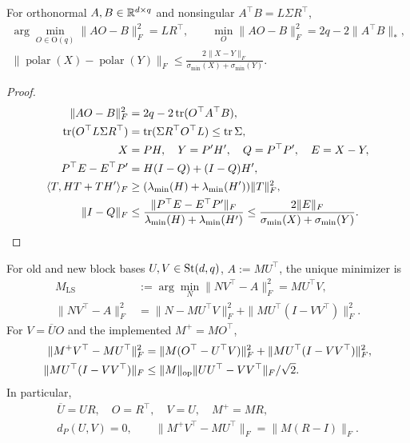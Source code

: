 \begin{lemma}\label{lem:rigid-polar}
For orthonormal $A,B\in\mathbb R^{d\times q}$ and nonsingular $A^\top B=L\Sigma R^\top$,
\begin{gather}
 \arg\min_{O\in\mathrm O(q)}\|AO-B\|_F^2=LR^\top,\qquad
 \min_O\|AO-B\|_F^2=2q-2\|A^\top B\|_*,\\
 \|\operatorname{polar}(X)-\operatorname{polar}(Y)\|_F
 \le\frac{2\|X-Y\|_F}{\sigma_{\min}(X)+\sigma_{\min}(Y)}.
\end{gather}
\end{lemma}
\begin{proof}
\begin{align}
 \|AO-B\|_F^2&=2q-2\operatorname{tr}(O^\top A^\top B),\\
 \operatorname{tr}(O^\top L\Sigma R^\top)&=\operatorname{tr}(\Sigma R^\top O^\top L)
 \le\operatorname{tr}\Sigma,\\
 X&=PH,\quad Y=P'H',\quad Q=P^\top P',\quad E=X-Y,\\
 P^\top E-E^\top P'&=H(I-Q)+(I-Q)H',\\
 \langle T,HT+TH'\rangle_F
 &\ge(\lambda_{\min}(H)+\lambda_{\min}(H'))\|T\|_F^2,\\
 \|I-Q\|_F&\le\frac{\|P^\top E-E^\top P'\|_F}
                         {\lambda_{\min}(H)+\lambda_{\min}(H')}
 \le\frac{2\|E\|_F}{\sigma_{\min}(X)+\sigma_{\min}(Y)}.
\end{align}
\end{proof}
\begin{proposition}
\label{prop:rigid-transport}
For old and new block bases $U,V\in\operatorname{St}(d,q)$, $A:=MU^\top$, the unique minimizer is
\begin{align}
 M_\mathrm{LS}&:=\arg\min_N\|NV^\top-A\|_F^2=MU^\top V,\\
 \|NV^\top-A\|_F^2
 &=\|N-MU^\top V\|_F^2+\|MU^\top(I-VV^\top)\|_F^2.
\end{align}
For $V=\overline U O$ and the implemented $M^+=MO^\top$,
\begin{align}
 \|M^+V^\top-MU^\top\|_F^2
 &=\|M(O^\top-U^\top V)\|_F^2+
                              \|MU^\top(I-VV^\top)\|_F^2,\\
 \|MU^\top(I-VV^\top)\|_F
 &\le\|M\|_{\mathrm{op}}\|UU^\top-VV^\top\|_F/\sqrt2.
\end{align}
In particular,
\begin{gather}
 \overline U=UR,\quad O=R^\top,\quad V=U,\quad M^+=MR,\\
 d_P(U,V)=0,\qquad \|M^+V^\top-MU^\top\|_F=\|M(R-I)\|_F.
\end{gather}
\end{proposition}

